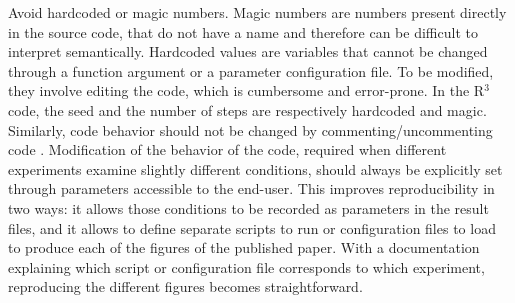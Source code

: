 \documentclass[a4paper,11pt]{article}
\begin{document}
Avoid hardcoded or magic numbers. Magic numbers are numbers present directly in the source code, that do not have a name and therefore can be difficult to interpret semantically. Hardcoded values are variables that cannot be changed through a function argument or a parameter configuration file. To be modified, they involve editing the code, which is cumbersome and error-prone. In the R$^3$ code, the seed and the number of steps are respectively hardcoded and magic.\\

Similarly, code behavior should not be changed by commenting/uncommenting code \citep{Wilson:2017}. Modification of the behavior of the code, required when different experiments examine slightly different conditions, should always be explicitly set through parameters accessible to the end-user. This improves reproducibility in two ways: it allows those conditions to be recorded as parameters in the result files, and it allows to define separate scripts to run or configuration files to load to produce each of the figures of the published paper. With a documentation explaining which script or configuration file corresponds to which experiment, reproducing the different figures becomes straightforward.\\
\end{document}
